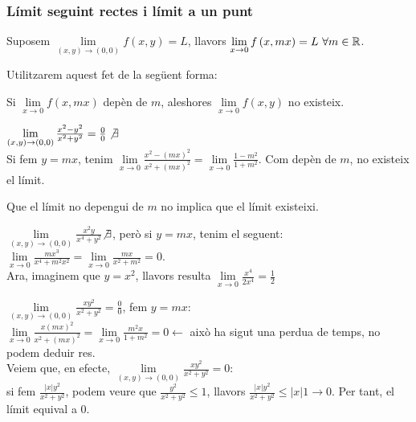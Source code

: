 \documentclass[../main.tex]{subfiles}
\begin{document}
    \subsubsection{Límit seguint rectes i límit a un punt}
    \begin{proposicio}
        Suposem $\lim\limits_{\left( x,y \right) \rightarrow \left( 0,0 \right)} f\left( x,y \right) = L$, llavors $\lim\limits_{x \rightarrow 0} f\left( x, mx \right) = L \hbox{ }\forall m \in \mathbb{R}$.
    \end{proposicio}
    Utilitzarem aquest fet de la següent forma:
    \begin{corolari}
        Si $\lim\limits_{x\rightarrow0} f\left( x, mx \right)$ depèn de $m$, aleshores $\lim\limits_{x\rightarrow0}f\left( x,y \right)$ no existeix.
    \end{corolari}
    \begin{exemple}
        $\lim\limits_{\left( x,y \right) \rightarrow\left( 0,0 \right)} \frac{x^2-y^2}{x^2+y^2} = \frac{0}{0} \not\exists$\\
        Si fem $y = mx$, tenim $\lim\limits_{x \rightarrow 0} \frac{x^2-\left( mx \right)^2}{x^2+\left( mx \right)^2} = \lim\limits_{x \rightarrow 0} \frac{1-m^2}{1+m^2}$.
        Com depèn de $m$, no existeix el límit.
    \end{exemple}
    \begin{obs}
        Que el límit no depengui de $m$ no implica que el límit existeixi.
    \end{obs}
    \begin{exemple}
        $\lim\limits_{\left( x,y \right) \rightarrow\left( 0,0 \right)} \frac{x^2y}{x^4+y^2}$$\not\exists$, però si $y = mx$,
        tenim el seguent: $\lim\limits_{x\rightarrow0} \frac{mx^3}{x^4+m^2x^2} = \lim\limits_{x\rightarrow0} \frac{mx}{x^2+m^2} = 0$.\\
        Ara, imaginem que $y = x^2$, llavors resulta $\lim\limits_{x\rightarrow0} \frac{x^4}{2x^4} = \frac{1}{2}$
    \end{exemple}
    \begin{exemple}
        $\lim\limits_{\left( x,y \right) \rightarrow\left( 0,0 \right)} \frac{xy^2}{x^2+y^2} = \frac{0}{0}$, fem $y = mx$:\\
        $\lim\limits_{x \rightarrow0} \frac{x\left( mx \right)^2}{x^2+\left( mx \right)^2} = \lim\limits_{x \rightarrow0} \frac{m^2x}{1+m^2} = 0 \leftarrow$
        això ha sigut una perdua de temps, no podem deduir res.\\
        Veiem que, en efecte, $\lim\limits_{\left( x,y \right) \rightarrow\left( 0,0 \right)} \frac{xy^2}{x^2+y^2} = 0$:\\
        si fem $\frac{|x|y^2}{x^2+y^2}$, podem veure que $\frac{y^2}{x^2+y^2} \leq 1$, llavors $\frac{|x|y^2}{x^2+y^2} \leq |x|1 \longrightarrow 0$.
        Per tant, el límit equival a $0$.
    \end{exemple}
\end{document}
